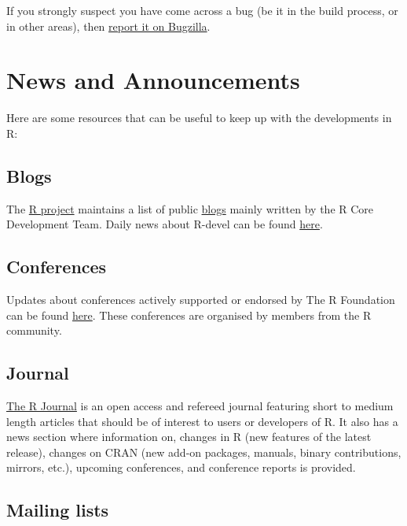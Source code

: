 \documentclass[
]{book}
\begin{document}
If you strongly suspect you have come across a bug (be it in the build process, or in other areas), then \protect\hyperlink{ReportBug}{report it on Bugzilla}.

\hypertarget{News}{%
\chapter{News and Announcements}\label{News}}

Here are some resources that can be useful to keep up with the developments in R:

\hypertarget{blogs}{%
\section{Blogs}\label{blogs}}

The \href{https://www.r-project.org/}{R project} maintains a list of public \href{https://developer.r-project.org/Blog/public/}{blogs} mainly written by the R Core Development Team. Daily news about R-devel can be found \href{https://developer.r-project.org/blosxom.cgi/R-devel}{here}.

\hypertarget{conferences}{%
\section{Conferences}\label{conferences}}

Updates about conferences actively supported or endorsed by The R Foundation can be found \href{https://www.r-project.org/conferences/}{here}. These conferences are organised by members from the R community.

\hypertarget{journal}{%
\section{Journal}\label{journal}}

\href{https://journal.r-project.org/}{The R Journal} is an open access and refereed journal featuring short to medium length articles that should be of interest to users or developers of R. It also has a news section where information on, changes in R (new features of the latest release), changes on CRAN (new add-on packages, manuals, binary contributions, mirrors, etc.), upcoming conferences, and conference reports is provided.

\hypertarget{mailing-lists-1}{%
\section{Mailing lists}\label{mailing-lists-1}}
\end{document}
